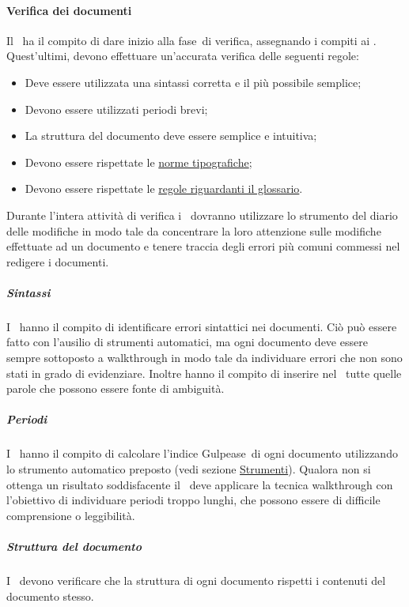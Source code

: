 \documentclass[../NormeProgetto.tex]{subfiles}
\begin{document}
	\paragraph{Verifica dei documenti}
	Il \responsabilediprogetto\ ha il compito di dare inizio alla fase\g\ di verifica, assegnando i compiti ai \verificatori. Quest'ultimi, devono effettuare un'accurata verifica delle seguenti regole:
	\begin{itemize}
		\item Deve essere utilizzata una sintassi corretta e il più possibile semplice;
		\item Devono essere utilizzati periodi brevi;
		\item La struttura del documento deve essere semplice e intuitiva;
		\item Devono essere rispettate le  \hyperref[sec:Norme tipografiche]{norme tipografiche};
		\item Devono essere rispettate le \hyperref[sec:Glossario]{regole riguardanti il glossario}.
	\end{itemize}
	Durante l'intera attività di verifica i \verificatori\ dovranno utilizzare lo strumento del diario delle modifiche in modo tale da concentrare la loro attenzione sulle modifiche effettuate ad un documento e tenere traccia degli errori più comuni commessi nel redigere i documenti.
		\subparagraph{Sintassi}
		I \verificatori\ hanno il compito di identificare errori sintattici nei documenti. Ciò può essere fatto con l'ausilio di strumenti automatici, ma ogni documento deve essere sempre sottoposto a walkthrough in modo tale da individuare errori che non sono stati in grado di evidenziare. Inoltre hanno il compito di inserire nel \glossario\ tutte quelle parole che possono essere fonte di ambiguità.
		\subparagraph{Periodi}
		I \verificatori\ hanno il compito di calcolare l'indice Gulpease\g\ di ogni documento utilizzando lo strumento automatico preposto (vedi sezione \hyperref[sec:Strumenti]{Strumenti}). Qualora non si ottenga un risultato soddisfacente il \verificatore\ deve applicare la tecnica walkthrough con l'obiettivo di individuare periodi troppo lunghi, che possono essere di difficile comprensione o leggibilità.
		\subparagraph{Struttura del documento}
		I \verificatori\ devono verificare che la struttura di ogni documento rispetti i contenuti del documento stesso.
\end{document}
